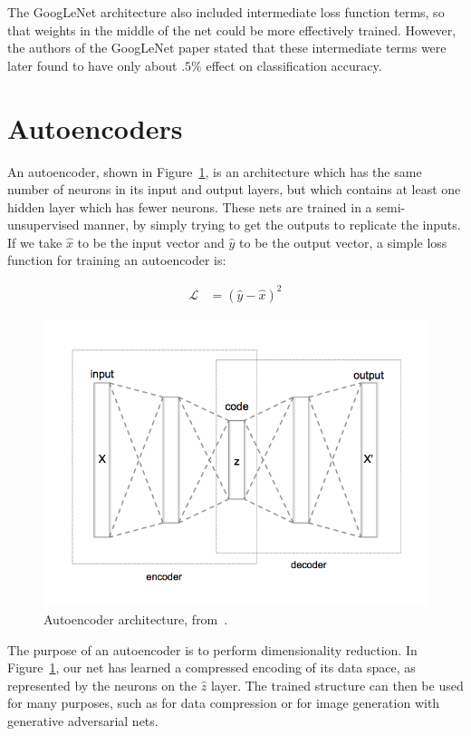 The GoogLeNet architecture also included intermediate loss function terms, so that weights in the middle of the net could be more effectively trained. However, the authors of the GoogLeNet paper stated that these intermediate terms were later found to have only about $.5\%$ effect on classification accuracy.

\section{Autoencoders}

An autoencoder, shown in Figure~\ref{fig:autoencoder}, is an architecture which has the same number of neurons in its input and output layers, but which contains at least one hidden layer which has fewer neurons. These nets are trained in a semi-unsupervised manner, by simply trying to get the outputs to replicate the inputs. If we take $\hat{x}$ to be the input vector and $\hat{y}$ to be the output vector, a simple loss function for training an autoencoder is:

\begin{align}
    \mathcal{L} &= (\hat{y}-\hat{x})^2
\end{align}

\begin{figure}[htbp]
    \centering
    \includegraphics[width=0.8\linewidth]{Images/ML/autoencoder.png}
    \caption{Autoencoder architecture, from~\cite{autoencoderDiagram}.}
    \label{fig:autoencoder}
\end{figure}

The purpose of an autoencoder is to perform dimensionality reduction. In Figure~\ref{fig:autoencoder}, our net has learned a compressed encoding of its data space, as represented by the neurons on the $\hat{z}$ layer. The trained structure can then be used for many purposes, such as for data compression or for image generation with generative adversarial nets.


